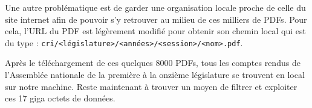 Une autre problématique est de garder une organisation locale proche de celle du site internet afin de pouvoir s'y retrouver au milieu de ces milliers de PDFs. Pour cela, l'URL du PDF est légèrement modifié pour obtenir son chemin local qui est du type : \verb|cri/<législature>/<années>/<session>/<nom>.pdf|.

Après le téléchargement de ces quelques 8000 PDFs, tous les comptes rendus de l'Assemblée nationale de la première à la onzième législature se trouvent en local sur notre machine. Reste maintenant à trouver un moyen de filtrer et exploiter ces 17 giga octets de données.
